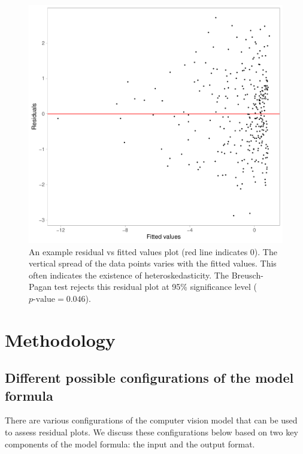 \documentclass[]{interact}
\theoremstyle{plain}%
\theoremstyle{definition}
\theoremstyle{remark}
\begin{document}
\begin{figure}[!h]

{\centering \includegraphics[width=1\linewidth]{paper_files/figure-latex/false-finding-1} 

}

\caption{An example residual vs fitted values plot (red line indicates 0). The vertical spread of the data points varies with the fitted values. This often indicates the existence of heteroskedasticity. The Breusch-Pagan test rejects this residual plot at 95\% significance level ($p\text{-value} = 0.046$).}\label{fig:false-finding}
\end{figure}

\section{Methodology}\label{methodology}

\subsection{Different possible configurations of the model
formula}\label{different-possible-configurations-of-the-model-formula}

There are various configurations of the computer vision model that can
be used to assess residual plots. We discuss these configurations below
based on two key components of the model formula: the input and the
output format.
\end{document}
